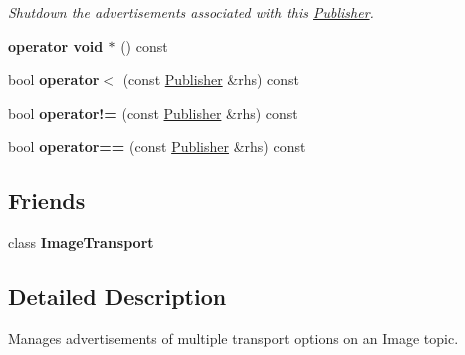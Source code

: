 \begin{DoxyCompactItemize}
\begin{DoxyCompactList}\small\item\em Shutdown the advertisements associated with this \hyperlink{classimage__transport_1_1_publisher}{Publisher}. \end{DoxyCompactList}\item 
\hypertarget{classimage__transport_1_1_publisher_abebb98c83a1d185504a528e46011ad5e}{{\bfseries operator void $\ast$} () const }\label{classimage__transport_1_1_publisher_abebb98c83a1d185504a528e46011ad5e}

\item 
\hypertarget{classimage__transport_1_1_publisher_a48f65b298d5f1127fcf5c0ff44ee23c1}{bool {\bfseries operator$<$} (const \hyperlink{classimage__transport_1_1_publisher}{Publisher} \&rhs) const }\label{classimage__transport_1_1_publisher_a48f65b298d5f1127fcf5c0ff44ee23c1}

\item 
\hypertarget{classimage__transport_1_1_publisher_a10b1cdd3affd8816707c7f4d14b9c2be}{bool {\bfseries operator!=} (const \hyperlink{classimage__transport_1_1_publisher}{Publisher} \&rhs) const }\label{classimage__transport_1_1_publisher_a10b1cdd3affd8816707c7f4d14b9c2be}

\item 
\hypertarget{classimage__transport_1_1_publisher_af152f8ef7d37537f4b099315e74ce977}{bool {\bfseries operator==} (const \hyperlink{classimage__transport_1_1_publisher}{Publisher} \&rhs) const }\label{classimage__transport_1_1_publisher_af152f8ef7d37537f4b099315e74ce977}

\end{DoxyCompactItemize}
\subsection*{Friends}
\begin{DoxyCompactItemize}
\item 
\hypertarget{classimage__transport_1_1_publisher_ac010f5a40d98825199e1c5303d0638eb}{class {\bfseries Image\-Transport}}\label{classimage__transport_1_1_publisher_ac010f5a40d98825199e1c5303d0638eb}

\end{DoxyCompactItemize}


\subsection{Detailed Description}
Manages advertisements of multiple transport options on an Image topic. 

